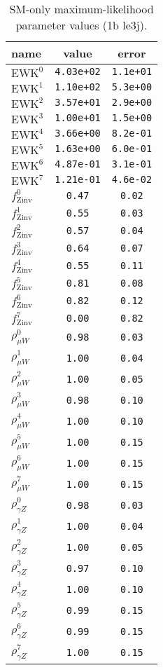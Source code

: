 \documentclass{article}
\begin{document}
\begin{table}\centering
\caption{SM-only maximum-likelihood parameter values (1b le3j).}
\label{tab:mlParameterValues1b_le3j}
\begin{tabular}{lcc}name & value & error \\ \hline
$\mathrm{EWK}^{0}$ & {\tt  4.03e+02} & {\tt  1.1e+01}\\
$\mathrm{EWK}^{1}$ & {\tt  1.10e+02} & {\tt  5.3e+00}\\
$\mathrm{EWK}^{2}$ & {\tt  3.57e+01} & {\tt  2.9e+00}\\
$\mathrm{EWK}^{3}$ & {\tt  1.00e+01} & {\tt  1.5e+00}\\
$\mathrm{EWK}^{4}$ & {\tt  3.66e+00} & {\tt  8.2e-01}\\
$\mathrm{EWK}^{5}$ & {\tt  1.63e+00} & {\tt  6.0e-01}\\
$\mathrm{EWK}^{6}$ & {\tt  4.87e-01} & {\tt  3.1e-01}\\
$\mathrm{EWK}^{7}$ & {\tt  1.21e-01} & {\tt  4.6e-02}\\
$f_\mathrm{Zinv}^{0}$ & {\tt 0.47} & {\tt 0.02}\\
$f_\mathrm{Zinv}^{1}$ & {\tt 0.55} & {\tt 0.03}\\
$f_\mathrm{Zinv}^{2}$ & {\tt 0.57} & {\tt 0.04}\\
$f_\mathrm{Zinv}^{3}$ & {\tt 0.64} & {\tt 0.07}\\
$f_\mathrm{Zinv}^{4}$ & {\tt 0.55} & {\tt 0.11}\\
$f_\mathrm{Zinv}^{5}$ & {\tt 0.81} & {\tt 0.08}\\
$f_\mathrm{Zinv}^{6}$ & {\tt 0.82} & {\tt 0.12}\\
$f_\mathrm{Zinv}^{7}$ & {\tt 0.00} & {\tt 0.82}\\
$\rho_{\mu W}^{0}$ & {\tt 0.98} & {\tt 0.03}\\
$\rho_{\mu W}^{1}$ & {\tt 1.00} & {\tt 0.04}\\
$\rho_{\mu W}^{2}$ & {\tt 1.00} & {\tt 0.05}\\
$\rho_{\mu W}^{3}$ & {\tt 0.98} & {\tt 0.10}\\
$\rho_{\mu W}^{4}$ & {\tt 1.00} & {\tt 0.10}\\
$\rho_{\mu W}^{5}$ & {\tt 1.00} & {\tt 0.15}\\
$\rho_{\mu W}^{6}$ & {\tt 1.00} & {\tt 0.15}\\
$\rho_{\mu W}^{7}$ & {\tt 1.00} & {\tt 0.15}\\
$\rho_{\gamma Z}^{0}$ & {\tt 0.98} & {\tt 0.03}\\
$\rho_{\gamma Z}^{1}$ & {\tt 1.00} & {\tt 0.04}\\
$\rho_{\gamma Z}^{2}$ & {\tt 1.00} & {\tt 0.05}\\
$\rho_{\gamma Z}^{3}$ & {\tt 0.97} & {\tt 0.10}\\
$\rho_{\gamma Z}^{4}$ & {\tt 1.00} & {\tt 0.10}\\
$\rho_{\gamma Z}^{5}$ & {\tt 0.99} & {\tt 0.15}\\
$\rho_{\gamma Z}^{6}$ & {\tt 0.99} & {\tt 0.15}\\
$\rho_{\gamma Z}^{7}$ & {\tt 1.00} & {\tt 0.15}\\
\hline
\end{tabular}
\end{table}
\end{document}

